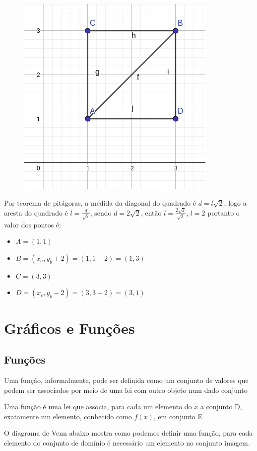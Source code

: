 \begin{multicols*}{2}
\begin{enumerate}
    \begin{figure}[H]
        \includegraphics[scale=0.3]{assets/rafael/img30.png}
    \end{figure}
     
    Por teorema de pitágoras, a medida da diagonal do quadrado é $d = l\sqrt{2}$, logo a aresta do quadrado é $l = \frac{d}{\sqrt{2}}$, sendo $d = 2 \sqrt{2}$, então $l = \frac{2 \sqrt{2}}{\sqrt{2}}$, $ l = 2$
    portanto o valor dos pontos é:
    \begin{itemize}
    \item $A = (1,1)$
    \item $B = (x_a, y_b+2) = (1,1+2) = (1,3) $
    \item $C = (3,3)$
    \item $D = (x_c, y_b - 2) = (3, 3 - 2) = (3,1)$
    \end{itemize}
    \end{enumerate}
            \section*{ Gráficos e Funções}
            
            \subsection*{Funções}
                  Uma função, informalmente, pode ser definida  como um conjunto de valores que podem ser 				associados por meio de uma lei com outro objeto num dado conjunto
                  
                \begin{theorem}
                    Uma função é uma lei que associa, para cada um elemento do $x$ a conjunto D, exatamente 				um elemento, conhecido como $f(x)$, em conjunto E
                \end{theorem}
                O diagrama de Venn abaixo mostra como podemos definir uma função, para cada elemento do 				conjunto de domínio é necessário um elemento no conjunto imagem.
            

\end{multicols*}
